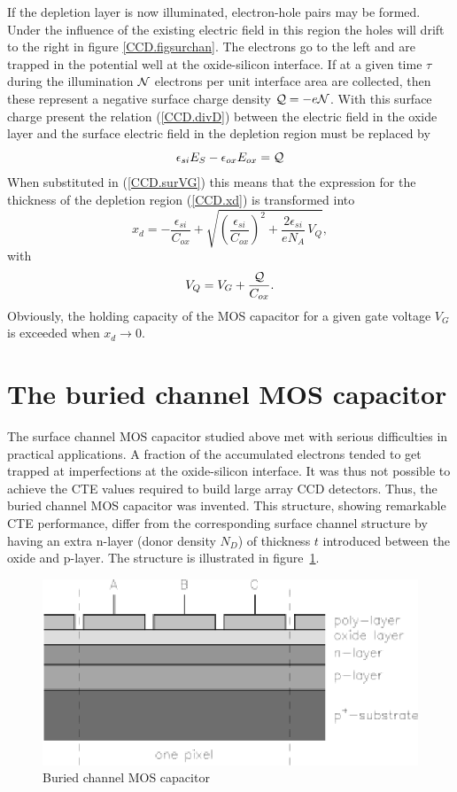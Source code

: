 If the depletion layer is now illuminated, electron-hole pairs may be
formed. Under the influence of the existing electric field in this
region the holes will drift to the right in figure
\ref{CCD.figsurchan}. The electrons go to the left and are trapped in
the potential well at the oxide-silicon interface. If at a given time
$\tau$ during the illumination ${\cal N}$ electrons per unit interface
area are collected, then these represent a negative surface charge
density ${\cal Q} = -e{\cal N}$. With this surface charge present the
relation (\ref{CCD.divD}) between the electric field in the oxide layer
and the surface electric field in the depletion region must be
replaced by
\begin{equation}
  \epsilon_{si} E_S - \epsilon_{ox} E_{ox} = {\cal Q}
\end{equation}
When substituted in (\ref{CCD.surVG}) this means that the expression
for the thickness of the depletion region (\ref{CCD.xd}) is
transformed into
\begin{equation}
  x_d = -\frac{\epsilon_{si}}{C_{ox}} +
  \sqrt{\left(\frac{\epsilon_{si}}{C_{ox}}\right)^2+\frac{2\epsilon_{si}}{eN_A} \, V_Q},
\end{equation}
with
\begin{equation}
  V_Q = V_G + \frac{{\cal Q}}{C_{ox}}.
\end{equation}
Obviously, the holding capacity of the MOS capacitor for a given gate
voltage $V_G$ is exceeded when $x_d \rightarrow 0$.

\section{The buried channel MOS capacitor}

The surface channel MOS capacitor studied above met with serious
difficulties in practical applications. A fraction of the accumulated
electrons tended to get trapped at imperfections at the oxide-silicon
interface. It was thus not possible to achieve the CTE values required
to build large array CCD detectors. Thus, the buried channel MOS
capacitor was invented. This structure, showing remarkable CTE
performance, differ from the corresponding surface channel structure
by having an extra n-layer (donor density $N_D$) of thickness $t$
introduced between the oxide and p-layer. The structure is
illustrated in figure~\ref{CCD.fignMOS}.

\begin{figure}[h]
  \centering
	\includegraphics{CCD_nMOS.eps}
  \caption{Buried channel MOS capacitor}
  \label{CCD.fignMOS}
\end{figure}

